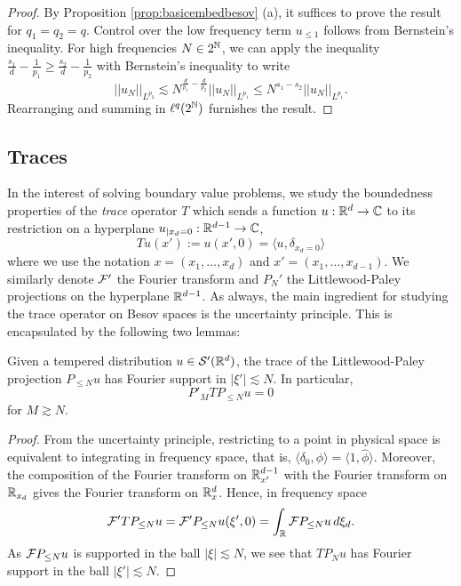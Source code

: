 \begin{proof}
	By Proposition \ref{prop:basicembedbesov} (a), it suffices to prove the result for $q_1 = q_2 = q$. Control over the low frequency term $u_{\leq 1}$ follows from Bernstein's inequality. For high frequencies $N \in 2^\mathbb N$, we can apply the inequality $\frac{s_1}{d} - \frac{1}{p_1} \geq \frac{s_2}{d} - \frac{1}{p_2}$ with Bernstein's inequality to write 
		\[ || u_N||_{L^{p_2}} \lesssim N^{\frac{d}{p_1} - \frac{d}{p_2}} ||u_N||_{L^{p_1}} \leq N^{s_1 - s_2} ||u_N||_{L^{p_1}}. \]
	Rearranging and summing in $\ell^q (2^\mathbb N)$ furnishes the result. 	
\end{proof}

\subsection{Traces}

In the interest of solving boundary value problems, we study the boundedness properties of the \emph{trace} operator $T$ which sends a function $u : \mathbb R^d \to \mathbb C$ to its restriction on a hyperplane $u_{|x_d = 0} : \mathbb R^{d - 1} \to \mathbb C$, 
	\[ T u (x') := u(x', 0) = \langle u, \delta_{x_d = 0} \rangle \]
where we use the notation $x = (x_1, \dots, x_d)$ and $x' = (x_1, \dots, x_{d - 1})$. We similarly denote $\mathcal F'$ the Fourier transform and $P_N'$ the Littlewood-Paley projections on the hyperplane $\mathbb R^{d - 1}$. As always, the main ingredient for studying the trace operator on Besov spaces is the uncertainty principle. This is encapsulated by the following two lemmas: 

\begin{lemma}
	Given a tempered distribution $u \in \mathcal S' (\mathbb R^d)$, the trace of the Littlewood-Paley projection $P_{\leq N} u$ has Fourier support in $|\xi'| \lesssim N$. In particular, 
		\[ P'_M T P_{\leq N} u = 0 \]
	for $M \gtrsim N$. 
\end{lemma}

\begin{proof}
	From the uncertainty principle, restricting to a point in physical space is equivalent to integrating in frequency space, that is, $\langle \delta_0, \phi \rangle = \langle 1, \widehat \phi \rangle$. Moreover, the composition of the Fourier transform on $\mathbb R^{d - 1}_{x'}$ with the Fourier transform on $\mathbb R_{x_d}$ gives the Fourier transform on $\mathbb R^d_x$. Hence, in frequency space
		\[ \mathcal F' T P_{\leq N} u = \mathcal F' P_{\leq N} u (\xi', 0) = \int_\mathbb R \mathcal F P_{\leq N} u \, d\xi_d. \]
	As $\mathcal F P_{\leq N} u$ is supported in the ball $|\xi| \lesssim N$, we see that $T P_N u$ has Fourier support in the ball $|\xi'| \lesssim N$. 	
\end{proof}

